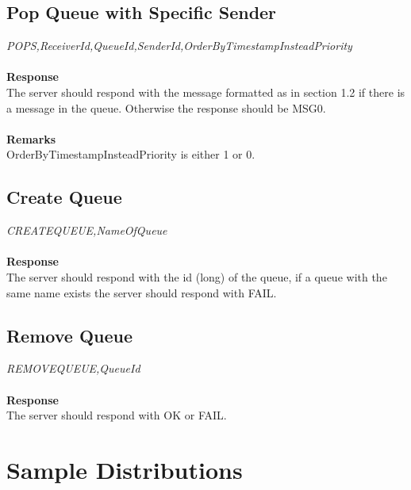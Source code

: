 \documentclass{article}
\begin{document}
            \subsection{Pop Queue with Specific Sender}
                \indent\indent\textit{POPS,ReceiverId,QueueId,SenderId,OrderByTimestampInsteadPriority}\\
                \\
                \textbf{Response}\\
                The server should respond with the message formatted as in section 1.2 if there is a message in the queue. Otherwise the response should be MSG0.\\
                \\
                \textbf{Remarks}\\
                OrderByTimestampInsteadPriority is either 1 or 0.

            \subsection{Create Queue}
                \indent\indent\textit{CREATEQUEUE,NameOfQueue}\\
                \\
                \textbf{Response}\\
                The server should respond with the id (long) of the queue, if a queue with the same name exists the server should respond with FAIL.

            \subsection{Remove Queue}
                \indent\indent\textit{REMOVEQUEUE,QueueId}\\
                \\
                \textbf{Response}\\
                The server should respond with OK or FAIL.

        \section{Sample Distributions}
        
\end{document}
